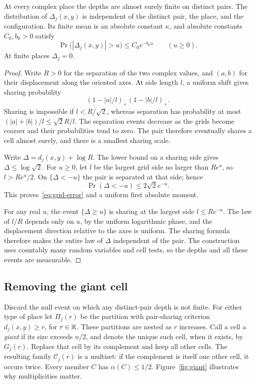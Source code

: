 \begin{lemma}\label{lem:hier-grid}
At every complex place the depths are almost surely finite on distinct
pairs.  The distribution of $\Delta_j(x,y)$ is independent of the
distinct pair, the place, and the configuration.  Its finite mean is
an absolute constant $\kappa$, and absolute constants $C_0,b_0>0$
satisfy
\begin{equation}\label{eq:grid-error}
 \Pr\bigl(|\Delta_j(x,y)|>u\bigr)\le C_0e^{-b_0u}
 \qquad(u\ge0).
\end{equation}
At finite places $\Delta_j=0$.
\end{lemma}

\begin{proof}
Write $R>0$ for the separation of the two complex values, and
$(a,b)$ for their displacement along the oriented axes.  At side
length $l$, a uniform shift gives sharing probability
\[
 (1-|a|/l)_+(1-|b|/l)_+.
\]
Sharing is impossible if $l<R/\sqrt2$, whereas separation has
probability at most $(|a|+|b|)/l\le\sqrt2R/l$.  The separation events
decrease as the grids become coarser and their probabilities tend to
zero.  The pair therefore eventually shares a cell almost surely,
and there is a smallest sharing scale.

Write $\Delta=d_j(x,y)+\log R$.  The lower bound on a sharing side
gives $\Delta\le\log\sqrt2$.  For $u\ge0$, let $l$ be the largest grid
side no larger than $Re^u$, so $l>Re^u/2$.  On $\{\Delta<-u\}$ the
pair is separated at that side; hence
\[
 \Pr(\Delta<-u)\le2\sqrt2e^{-u}.
\]
This proves~\eqref{eq:grid-error} and a uniform first absolute moment.

For any real $u$, the event $\{\Delta\ge u\}$ is sharing at the
largest side $l\le Re^{-u}$.  The law of $l/R$ depends only on $u$,
by the uniform logarithmic phase, and the displacement direction
relative to the axes is uniform.  The sharing formula therefore
makes the entire law of $\Delta$ independent of the pair.  The
construction uses countably many random variables and cell tests,
so the depths and all these events are measurable.
\end{proof}

\subsection{Removing the giant cell}

Discard the null event on which any distinct-pair depth is not finite.
For either type of place let $\Pi_j(r)$ be the partition with
pair-sharing criterion $d_j(x,y)\ge r$, for $r\in\mathbb R$.  These partitions
are nested as $r$ increases.  Call a cell a \emph{giant} if its size
exceeds $n/2$, and denote the unique such cell, when it exists, by
$G_j(r)$.  Replace that cell by its complement and keep all other
cells.  The resulting family $\mathcal C_j(r)$ is a multiset: if the
complement is itself one other cell, it occurs twice.  Every member
$C$ has $\alpha(C)\le1/2$.
Figure~\ref{fig:giant} illustrates why multiplicities matter.


